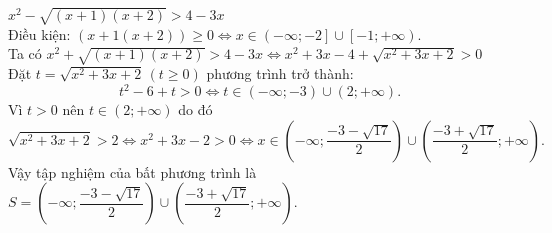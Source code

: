 \begin{bt}
{\begin{listEX}[1]
			$x^2-\sqrt{(x+1)(x+2)}>4-3x$ \\
			Điều kiện: $(x+1(x+2))\geq 0\Leftrightarrow x\in \left(-\infty; -2\right]\cup \left[-1;+\infty\right)$.\\
			Ta có $x^2+\sqrt{(x+1)(x+2)}>4-3x\Leftrightarrow x^2+3x-4+\sqrt{x^2+3x+2}> 0$\\
			Đặt $t=\sqrt{x^2+3x+2}\, (t\ge 0) $	phương trình trở thành:
			$$t^2-6+t>0\Leftrightarrow t\in (-\infty;-3)\cup (2;+\infty).$$
			Vì $t>0$ nên $t\in (2;+\infty)$ do đó
			$$\sqrt{x^2+3x+2}> 2\Leftrightarrow x^2+3x-2> 0
			\Leftrightarrow x\in \left(-\infty;\dfrac{-3-\sqrt{17}}{2}\right)\cup \left(\dfrac{-3+\sqrt{17}}{2}; +\infty\right).$$
			Vậy tập nghiệm của bất phương trình là $S= \left(-\infty;\dfrac{-3-\sqrt{17}}{2}\right)\cup \left(\dfrac{-3+\sqrt{17}}{2}; +\infty\right)$. 
		\end{listEX}
	}
\end{bt}

